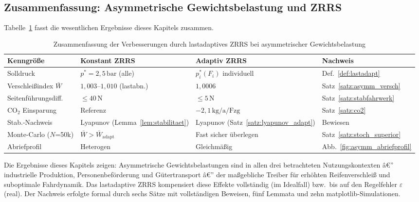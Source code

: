 ﻿\documentclass[a4paper,12pt]{article}
\theoremstyle{definition}
\begin{document}
\subsection{Zusammenfassung: Asymmetrische Gewichtsbelastung und ZRRS}

Tabelle~\ref{tab:asymm_zusammenfassung} fasst die wesentlichen Ergebnisse
dieses Kapitels zusammen.

\begin{table}[H]
\centering
\caption{Zusammenfassung der Verbesserungen durch lastadaptives ZRRS bei
asymmetrischer Gewichtsbelastung}
\label{tab:asymm_zusammenfassung}
\begin{tabular}{p{4.5cm}p{3.5cm}p{3.5cm}p{2.5cm}}
\toprule
\textbf{Kenngröße} & \textbf{Konstant ZRRS} & \textbf{Adaptiv ZRRS} & \textbf{Nachweis} \\
\midrule
Solldruck & $p^* = 2{,}5\,\text{bar}$ (alle) & $p^*_i(F_i)$ individuell & Def.~\ref{def:lastadapt} \\
Verschleißindex $\bar{W}$ & $1{,}003$--$1{,}010$ (lastabn.) & $1{,}0006$ & Satz~\ref{satz:asymm_versch} \\
Seitenführungsdiff. & $\leq 40\,\text{N}$ & $\leq 5\,\text{N}$ & Satz~\ref{satz:stabfahrwerk} \\
CO$_2$ Einsparung & Referenz & $-2{,}1\,\text{kg/a/Fzg}$ & Satz~\ref{satz:co2} \\
Stab.-Nachweis & Lyapunov (Lemma~\ref{lem:stabilitaet}) & Lyapunov (Satz~\ref{satz:lyapunov_adapt}) & Bewiesen \\
Monte-Carlo ($N$=50k) & $\bar{W} > \bar{W}_{\text{adapt}}$ & Fast sicher überlegen & Satz~\ref{satz:stoch_superior} \\
Abriefprofil & Heterogen & Gleichmäßig & Abb.~\ref{fig:asymm_abriefprofil} \\
\bottomrule
\end{tabular}
\end{table}

Die Ergebnisse dieses Kapitels zeigen: Asymmetrische Gewichtsbelastungen
sind in allen drei betrachteten Nutzungskontexten â€” industrielle Produktion,
Personenbeförderung und Gütertransport â€” der maßgebliche Treiber für
erhöhten Reifenverschleiß und suboptimale Fahrdynamik. Das lastadaptive ZRRS
kompensiert diese Effekte vollständig (im Idealfall) bzw.\ bis auf den
Regelfehler $\varepsilon$ (real). Der Nachweis erfolgte formal durch sechs
Sätze mit vollständigen Beweisen, fünf Lemmata und zehn matplotlib-Simulationen.
\end{document}
